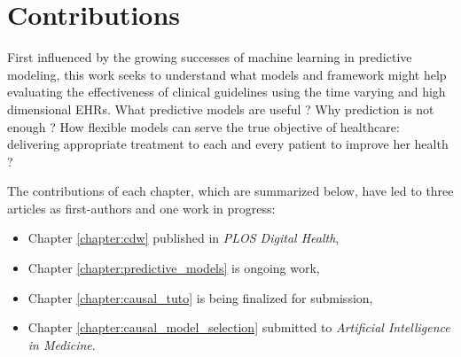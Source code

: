 \documentclass[french,12pt,twoside,a4paper]{book}
\begin{document}
\section{Contributions}\label{sec:intro:contributions}


First influenced by the growing successes of machine learning in predictive
modeling, this work seeks to understand what models and framework might help
evaluating the effectiveness of clinical guidelines using the time varying and
high dimensional EHRs. What predictive models are useful ?
Why prediction is not enough ? How flexible models can serve the true
objective of healthcare: delivering appropriate treatment to each and every
patient to improve her health \citep{cma_policy_appropriateness_2015}?

The contributions of each chapter, which are summarized below, have led to three
articles as first-authors and one work in progress:

\begin{itemize}
  \item Chapter \ref{chapter:cdw} published in \emph{PLOS Digital Health},
  \item Chapter \ref{chapter:predictive_models} is ongoing work,
  \item Chapter \ref{chapter:causal_tuto} is being finalized for submission,
  \item Chapter \ref{chapter:causal_model_selection} submitted to \emph{Artificial Intelligence in Medicine}.
\end{itemize}
\end{document}
